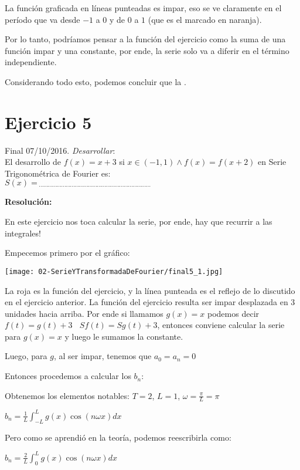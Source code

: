 \documentclass[11pt]{article}
\begin{document}
	La función graficada en líneas punteadas es impar, eso se ve claramente en el período que va desde $-1$ a $0$ y de $0$ a $1$ (que es el marcado en naranja).
	
	Por lo tanto, podríamos pensar a la función del ejercicio como la suma de una función impar y una constante, por ende, la serie solo va a diferir en el término independiente.
	
	Considerando todo esto, podemos concluir que la .
	\section{Ejercicio 5}
	Final 07/10/2016. \textit{Desarrollar}:\\
	El desarrollo de $f(x)=x+3$ si $x\in(-1,1)\wedge f(x)=f(x+2)$ en Serie Trigonométrica de Fourier es:\\
	$S(x)=_{\;\cdots\cdots\cdots\cdots\cdots\cdots\cdots\cdots\cdots\cdots\cdots\cdots\cdots\cdots\cdots\cdots\cdots\cdots\cdots\cdots\cdots\cdots\cdots\cdots\cdots}$
	
	\textbf{Resolución:}
	
	En este ejercicio nos toca calcular la serie, por ende, hay que recurrir a las integrales!
	
	Empecemos primero por el gráfico:
	\begin{center}
		\texttt{[image: 02-SerieYTransformadaDeFourier/final5\_1.jpg]}
	\end{center}

	La roja es la función del ejercicio, y la línea punteada es el reflejo de lo discutido en el ejercicio anterior. La función del ejercicio resulta ser impar desplazada en 3 unidades hacia arriba. Por ende si llamamos $g(x)=x$ podemos decir $f(t)=g(t)+3\;$ \textrightarrow $\;Sf(t)=Sg(t)+3$, entonces conviene calcular la serie para $g(x)=x$ y luego le sumamos la constante.
	
	Luego, para $g$, al ser impar, tenemos que $a_{0}=a_{n}=0$
	
	Entonces procedemos a calcular los $b_{n}$:
	
	Obtenemos los elementos notables: $T=2$, $L=1$, $\omega=\frac{\pi}{L}=\pi$
	
	$\displaystyle b_{n}= \frac{1}{L} \int_{-L}^{L} g(x)\cos(n\omega x) dx$
	
	Pero como se aprendió en la teoría, podemos reescribirla como:
	
	$\displaystyle b_{n}= \frac{2}{L} \int_{0}^{L} g(x)\cos(n\omega x) dx$
	
\end{document}
